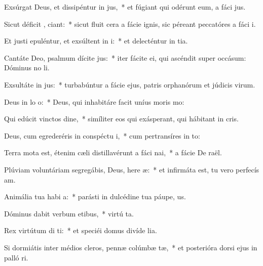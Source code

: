 \item Exsúrgat Deus, et dissipéntur in jus,~* et fúgiant qui odérunt eum, a fáci jus.
\item Sicut déficit , ciant:~* sicut fluit cera a fácie ignis, sic péreant peccatóres a fáci i.
\item Et justi epuléntur, et exsúltent in  i:~* et delecténtur in tia.
\item Cantáte Deo, psalmum dícite  jus:~* iter fácite ei, qui ascéndit super occásum: Dóminus no li.
\item Exsultáte in  jus:~* turbabúntur a fácie ejus, patris orphanórum et júdicis virum.
\item Deus in lo  o:~* Deus, qui inhabitáre facit uníus moris  mo:
\item Qui edúcit vinctos  dine,~* simíliter eos qui exásperant, qui hábitant in cris.
\item Deus, cum egrederéris in conspéctu  i,~* cum pertransíres in to:
\item Terra mota est, étenim cæli distillavérunt a fáci  nai,~* a fácie De raël.
\item Plúviam voluntáriam segregábis, Deus, here æ:~* et infirmáta est, tu vero perfecís am.
\item Animália tua habi  a:~* parásti in dulcédine tua páupe, us.
\item Dóminus dabit verbum etibus,~* virtú ta.
\item Rex virtútum di ti:~* et speciéi domus divíde lia.
\item Si dormiátis inter médios cleros, pennæ colúmbæ tæ,~* et posterióra dorsi ejus in palló ri.
